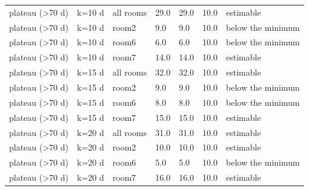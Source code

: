 \begin{tabular}{lllllll}
plateau (>70 d) & k=10 d & all rooms & 29.0 & 29.0 & 10.0 & estimable \\
plateau (>70 d) & k=10 d & room2 & 9.0 & 9.0 & 10.0 & below the minimum \\
plateau (>70 d) & k=10 d & room6 & 6.0 & 6.0 & 10.0 & below the minimum \\
plateau (>70 d) & k=10 d & room7 & 14.0 & 14.0 & 10.0 & estimable \\
plateau (>70 d) & k=15 d & all rooms & 32.0 & 32.0 & 10.0 & estimable \\
plateau (>70 d) & k=15 d & room2 & 9.0 & 9.0 & 10.0 & below the minimum \\
plateau (>70 d) & k=15 d & room6 & 8.0 & 8.0 & 10.0 & below the minimum \\
plateau (>70 d) & k=15 d & room7 & 15.0 & 15.0 & 10.0 & estimable \\
plateau (>70 d) & k=20 d & all rooms & 31.0 & 31.0 & 10.0 & estimable \\
plateau (>70 d) & k=20 d & room2 & 10.0 & 10.0 & 10.0 & estimable \\
plateau (>70 d) & k=20 d & room6 & 5.0 & 5.0 & 10.0 & below the minimum \\
plateau (>70 d) & k=20 d & room7 & 16.0 & 16.0 & 10.0 & estimable \\
\hline
\end{tabular}
